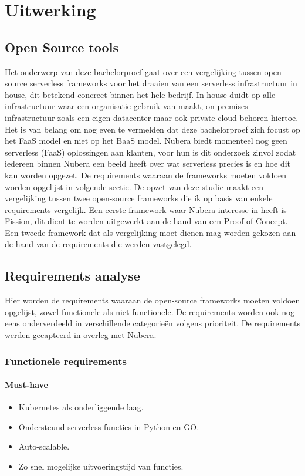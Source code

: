 \chapter{Uitwerking}
\label{ch:uitwerking}
\section{Open Source tools}
Het onderwerp van deze bachelorproef gaat over een vergelijking tussen open-source serverless frameworks voor het draaien van een serverless infrastructuur in house, dit betekend concreet binnen het hele bedrijf. In house duidt op alle infrastructuur waar een organisatie gebruik van maakt, on-premises infrastructuur zoals een eigen datacenter maar ook private cloud behoren hiertoe. Het is van belang om nog even te vermelden dat deze bachelorproef zich focust op het FaaS model en niet op het BaaS model. Nubera biedt momenteel nog geen serverless (FaaS) oplossingen aan klanten, voor hun is dit onderzoek zinvol zodat iedereen binnen Nubera een beeld heeft over wat serverless precies is en hoe dit kan worden opgezet. De requirements waaraan de frameworks moeten voldoen worden opgelijst in volgende sectie. De opzet van deze studie maakt een vergelijking tussen twee open-source frameworks die ik op basis van enkele requirements vergelijk. Een eerste framework waar Nubera interesse in heeft is Fission, dit dient te worden uitgewerkt aan de hand van een Proof of Concept. Een tweede framework dat als vergelijking moet dienen mag worden gekozen aan de hand van de requirements die werden vastgelegd.

\section{Requirements analyse}
Hier worden de requirements waaraan de open-source frameworks moeten voldoen opgelijst, zowel functionele als niet-functionele. De requirements worden ook nog eens onderverdeeld in verschillende categorieën volgens prioriteit. De requirements werden gecapteerd in overleg met Nubera.

\subsection{Functionele requirements}
\subsubsection{Must-have}
\begin{itemize}
    \item Kubernetes als onderliggende laag.
    \item Ondersteund serverless functies in Python en GO.
    \item Auto-scalable.
    \item Zo snel mogelijke uitvoeringstijd van functies.
\end{itemize}
